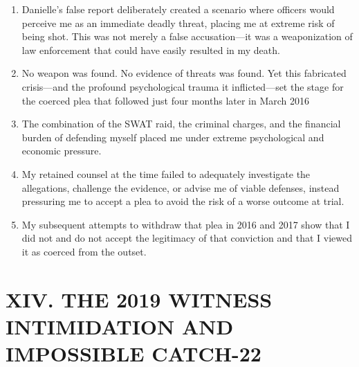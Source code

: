 \documentclass[12pt,letterpaper]{article}
\begin{document}
\begin{enumerate}
\item Danielle's false report deliberately created a scenario where officers would perceive me as an immediate deadly threat, placing me at extreme risk of being shot. This was not merely a false accusation---it was a weaponization of law enforcement that could have easily resulted in my death.

\item No weapon was found. No evidence of threats was found. Yet this fabricated crisis---and the profound psychological trauma it inflicted---set the stage for the coerced plea that followed just four months later in March 2016

\item The combination of the SWAT raid, the criminal charges, and the financial burden of defending myself placed me under extreme psychological and economic pressure.

\item My retained counsel at the time failed to adequately investigate the allegations, challenge the evidence, or advise me of viable defenses, instead pressuring me to accept a plea to avoid the risk of a worse outcome at trial.

\item My subsequent attempts to withdraw that plea in 2016 and 2017 show that I did not and do not accept the legitimacy of that conviction and that I viewed it as coerced from the outset.

\end{enumerate}

\section*{XIV. THE 2019 WITNESS INTIMIDATION AND IMPOSSIBLE CATCH-22}
\end{document}
